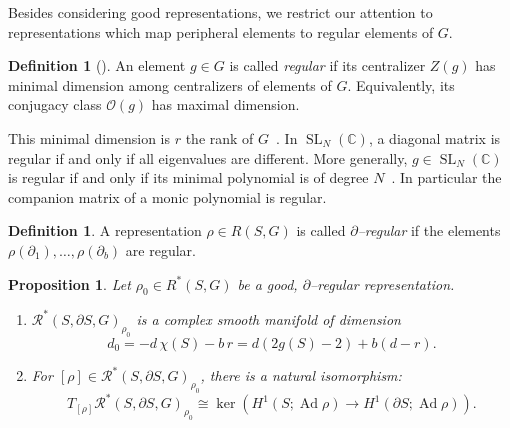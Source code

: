 \documentclass[11pt]{article}
\newtheorem{prop}[theo]{Proposition}
\theoremstyle{definition}
\newtheorem{defi}[theo]{Definition}
\numberwithin{equation}{section}
\numberwithin{figure}{section}
\numberwithin{table}{section}
\DeclareMathOperator{\SL}{SL}
\DeclareMathOperator{\Ad}{Ad}
\newcommand{\Rcal}{\mathcal{R}}
\newcommand{\Ocal}{\mathcal{O}}
\newcommand{\Cbb}{\mathbb{C}}
\newcommand*\dG{{d}}
\newcommand*\rG{r}
\newcommand*\bS{b}
\newcommand*\Rg{\Rcal^*}
\newcommand*{\alphenumi}{\renewcommand*{\theenumi}{\alph{enumi}}}
\begin{document}
Besides considering good representations, we restrict our attention to representations which map peripheral elements to regular elements of $G$.

\begin{defi}[{\cite[Section~3.5]{Steinberg}}]\label{Definition:regular}
An element $g\in G$ is called \emph{regular} if its centralizer $Z(g)$ has minimal dimension among centralizers of elements of $G$. Equivalently, its conjugacy class $\Ocal(g)$ has maximal dimension.
\end{defi}

This minimal dimension is $\rG$ the rank of $G$~\cite[Section~3.5, Proposition~1]{Steinberg}. In $\SL_N (\Cbb)$, a diagonal matrix is regular if and only if all eigenvalues are different. More generally, $g\in\SL_N (\Cbb)$ is regular if and only if its minimal polynomial is of degree $N$~\cite[Section~3.5, Proposition~2]{Steinberg}. In particular the companion matrix of a monic polynomial is regular.

\begin{defi}\label{Definition:partialregular}
A representation $\rho\in R(S,G)$ is called \emph{$\partial$--regular} if the elements $\rho(\partial_1),\dotsc,\rho(\partial_\bS)$ are regular.
\end{defi}


\begin{prop}\label{prop:relsmooth}
Let $\rho_0\in R^*(S,G)$ be a good, $\partial$--regular representation.
\begin{enumerate}\alphenumi
\item $\Rg(S,\partial S, G)_{\rho_0}$ is a complex smooth manifold of dimension
\[
d_0=-\dG\,\chi(S)-\bS\, \rG = \dG (2 g(S) -2)+\bS (\dG-\rG).
\]
\item For $[\rho]\in \Rg(S,\partial S, G)_{\rho_0} $, there is a natural isomorphism:
\[
T_{[\rho]} \Rg(S,\partial S, G)_{\rho_0}\cong\ker \left(H^1(S;\Ad \rho)\to H^1(\partial S;\Ad\rho)\right).
\]
\end{enumerate}
\end{prop}
\end{document}
